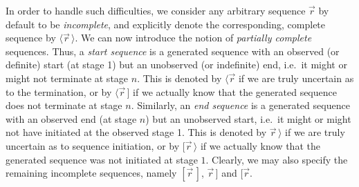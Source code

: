 \documentclass[a4paper]{article}
\begin{document}
In order to handle such difficulties, we consider any arbitrary sequence $\vec{r}$ by default to be {\em incomplete},
and explicitly denote the corresponding, complete sequence by $\langle\vec{r}\,\rangle$.
We can now introduce the notion of {\em partially complete} sequences. Thus, a {\em start sequence} is a generated sequence with an observed (or definite) start (at stage 1) 
but an unobserved (or indefinite) end, i.e.\ it might or might not terminate at stage $n$. This is denoted by $\langle\vec{r}$ if we are truly uncertain as to the termination,
or by  $\langle\vec{r}\,]$ if we actually know that the generated sequence does not terminate at stage $n$.
Similarly, an {\em end sequence} is a generated sequence with an observed end (at stage $n$) but an unobserved start, i.e.\ it might or might not have initiated at 
the observed stage 1. This is denoted by $\vec{r}\,\rangle$ if we are truly uncertain as to sequence initiation,
or by  $[\vec{r}\,\rangle$ if we actually know that the generated sequence was not initiated at stage $1$.
Clearly, we may also specify the remaining incomplete sequences, namely $[\vec{r}\,]$, $\vec{r}\,]$ and $[\vec{r}$.
\end{document}

